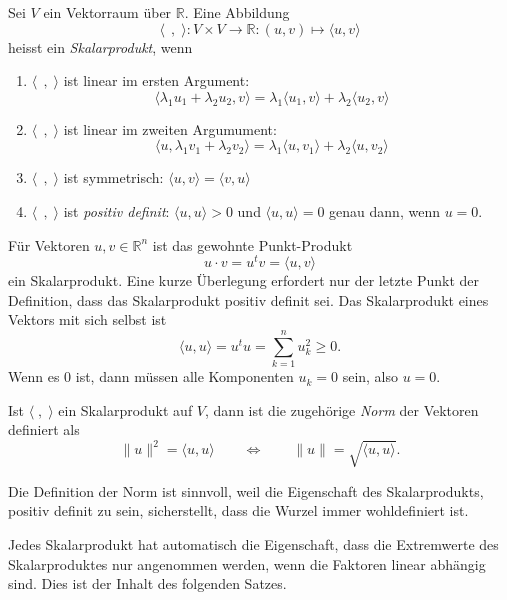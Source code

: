 \begin{definition}
Sei $V$ ein Vektorraum über $\mathbb R$.
Eine Abbildung
\[
\langle\;\,,\;\rangle
\colon
V\times V\to\mathbb R
:
(u,v)\mapsto \langle u,v\rangle
\]
heisst ein {\em Skalarprodukt}, wenn
%
\begin{enumerate}
\item $\langle\;\,,\;\rangle$ ist linear im ersten Argument:
\begin{equation}
\langle \lambda_1 u_1+\lambda_2 u_2,v\rangle
=
\lambda_1 \langle u_1,v\rangle
+
\lambda_2 \langle u_2,v\rangle
\end{equation}
\item $\langle\;\,,\;\rangle$ ist linear im zweiten Argumument:
\begin{equation}
\langle u,\lambda_1 v_1+\lambda_2 v_2\rangle
=
\lambda_1 \langle u,v_1\rangle
+
\lambda_2 \langle u,v_2\rangle
\end{equation}
\item
$\langle\;\,,\;\rangle$
ist symmetrisch:
$\langle u,v\rangle=\langle v,u\rangle$
\item
$\langle\;\,,\;\rangle$
ist {\em positiv definit}: $\langle u,u\rangle > 0$ und
%
$\langle u,u\rangle=0$ genau dann, wenn $u=0$.
\end{enumerate}
\end{definition}

Für Vektoren $u,v\in\mathbb R^n$ ist das gewohnte Punkt-Produkt
\[
u\cdot v = u^t v = \langle u,v\rangle
\]
ein Skalarprodukt.
Eine kurze Überlegung erfordert nur der letzte Punkt der Definition,
dass das Skalarprodukt positiv definit sei.
Das Skalarprodukt eines Vektors mit sich selbst ist 
\[
\langle u,u\rangle = u^t u = \sum_{k=1}^n u_k^2 \ge 0.
\]
Wenn es $0$ ist, dann müssen alle Komponenten $u_k=0$ sein, also $u=0$.

\begin{definition}
Ist $\langle\;,\;\rangle$ ein Skalarprodukt auf $V$, dann ist die zugehörige
{\em Norm} der Vektoren definiert als
%
\[
\| u \|^2 = \langle u,u\rangle
\qquad\Leftrightarrow\qquad
\| u\| = \sqrt{\langle u,u\rangle}.
\]
\end{definition}

Die Definition der Norm ist sinnvoll, weil die Eigenschaft des Skalarprodukts,
positiv definit zu sein, sicherstellt, dass die Wurzel immer wohldefiniert
ist.

Jedes Skalarprodukt hat automatisch die Eigenschaft, dass die Extremwerte
des Skalarproduktes nur angenommen werden, wenn die Faktoren linear
abhängig sind.
Dies ist der Inhalt des folgenden Satzes.


